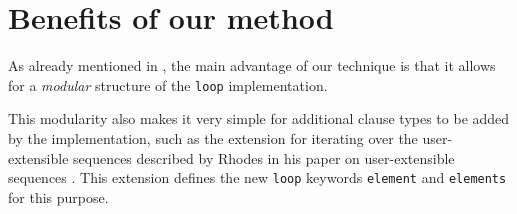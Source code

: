 \section{Benefits of our method}
 
As already mentioned in , the main advantage
of our technique is that it allows for a \emph{modular} structure of
the \texttt{loop} implementation.

This modularity also makes it very simple for additional clause types
to be added by the \commonlisp{} implementation, such as the extension
for iterating over the user-extensible sequences described by Rhodes
in his paper on user-extensible sequences
\cite{Rhodes:2007:USC:1622123.1622138}.  This extension defines the
new \texttt{loop} keywords \texttt{element} and \texttt{elements} for
this purpose.
